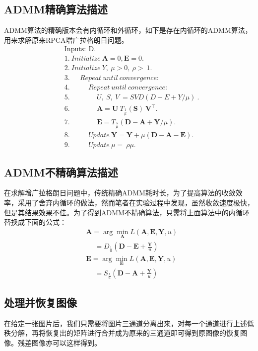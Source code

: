 \documentclass{article}
\begin{document}
 	\subsection{ADMM精确算法描述}
 	ADMM算法的精确版本会有内循环和外循环，如下是存在内循环的ADMM算法，用来求解原来RPCA增广拉格朗日问题。
 	\begin{align}
 	& \mathrm{Inputs: ~D.} \nonumber \\
 	& 1.\ Initialize\ \mathbf{A}=0,\mathbf{E}=0. \nonumber \\
 	& 2.\ Initialize\ Y,\ \mu> 0,\ \rho>\ 1. \nonumber \\
 	& 3.\ \quad\ Repeat\ until\ convergence:\ \nonumber \\
 	& 4.\ \quad\ \quad\ Repeat\ until\ convergence: \nonumber \\
 	& 5.\ \quad\ \quad\ \quad\ U,\ S,\ V\ = SVD(D-E+Y/\mu)\ . \nonumber \\
 	& 6.\ \quad\ \quad\ \quad\ \mathbf{A}=\mathbf{U}\:T_{\frac1{\mu}}(\mathbf{S})\:\mathbf{V}^{\top}. \nonumber \\
 	& 7.\ \quad\ \quad\ \quad\ \mathbf{E}=T_{\frac\lambda{\mu}}(\mathbf{D}-\mathbf{A}+\mathbf{Y}/\mu). \nonumber \\
 	& 8.\ \quad\ \quad\ Update\ \mathbf{Y}=\mathbf{Y}+\mu(\mathbf{D}-\mathbf{A}-\mathbf{E}). \nonumber \\
 	& 9.\ \quad\ \quad\ Update\ \mu=\ \rho\mu. \nonumber 
 	\end{align}
 	\subsection{ADMM不精确算法描述}
 	在求解增广拉格朗日问题中，传统精确ADMM耗时长，为了提高算法的收敛效率，采用了舍弃内循环的做法，然而笔者在实验过程中发现，虽然收敛速度极快，但是其结果效果不佳。为了得到ADMM不精确算法，只需将上面算法中的内循环替换成下面的公式：
 	\begin{align}
 		& \mathbf{A} =\arg\min_\mathbf{A}L(\mathbf{A},\mathbf{E},\mathbf{Y},u) \nonumber \\
 		& \quad\ =D_{\frac1{u}}(\mathbf{D}-\mathbf{E}+\frac{\mathbf{Y}}{u}) \nonumber \\
 		& \mathbf{E}=\arg\min_\mathbf{E}L(\mathbf{A},\mathbf{E},\mathbf{Y},u) \nonumber \\
 		& \quad\ =S_{\frac\lambda{u}}(\mathbf{D}-\mathbf{A}+\frac{\mathbf{Y}}{u}) \nonumber 
 	\end{align}
 	\subsection{处理并恢复图像}
 	在给定一张图片后，我们只需要将图片三通道分离出来，对每一个通道进行上述低秩分解，再将恢复出的矩阵进行合并成为原来的三通道即可得到原图像的恢复图像。残差图像亦可以这样得到。
 \setcounter{section}{7}
\end{document}
